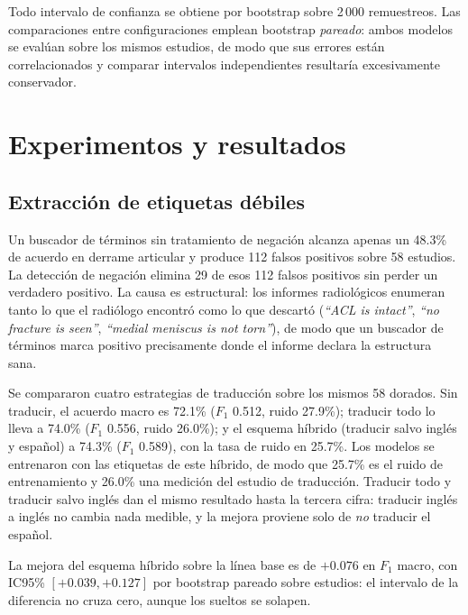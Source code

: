 \documentclass{article}
\begin{document}
Todo intervalo de confianza se obtiene por bootstrap sobre 2\,000 remuestreos.
Las comparaciones entre configuraciones emplean bootstrap \emph{pareado}: ambos
modelos se evalúan sobre los mismos estudios, de modo que sus errores están
correlacionados y comparar intervalos independientes resultaría excesivamente
conservador.

\section{Experimentos y resultados}

\subsection{Extracción de etiquetas débiles}
\label{sec:etiquetas_resultados}

Un buscador de términos sin tratamiento de negación alcanza apenas un 48.3\% de
acuerdo en derrame articular y produce 112 falsos positivos sobre 58 estudios. La detección de negación elimina 29 de esos 112 falsos positivos sin perder un verdadero positivo. La causa es estructural: los informes radiológicos
enumeran tanto lo que el radiólogo encontró como lo que descartó
(\emph{``ACL is intact''}, \emph{``no fracture is seen''}, \emph{``medial
meniscus is not torn''}), de modo que un buscador de términos marca positivo
precisamente donde el informe declara la estructura sana.

Se compararon cuatro estrategias de traducción sobre los mismos 58
dorados. Sin traducir, el acuerdo macro es 72.1\% ($F_1$ 0.512, ruido 27.9\%);
traducir todo lo lleva a 74.0\% ($F_1$ 0.556, ruido 26.0\%); y el esquema híbrido
(traducir salvo inglés y español) a 74.3\% ($F_1$ 0.589), con la tasa de ruido en
25.7\%. Los modelos se entrenaron con las etiquetas de este híbrido, de modo que
25.7\% es el ruido de entrenamiento y 26.0\% una medición del estudio de
traducción. Traducir todo y traducir salvo inglés dan el
mismo resultado hasta la tercera cifra: traducir inglés a inglés no cambia nada
medible, y la mejora proviene solo de \emph{no} traducir el español.

La mejora del esquema híbrido sobre la línea base es de $+0.076$ en $F_1$ macro,
con IC95\% $[+0.039, +0.127]$ por bootstrap pareado sobre estudios: el intervalo
de la diferencia no cruza cero, aunque los sueltos se solapen.
\end{document}
